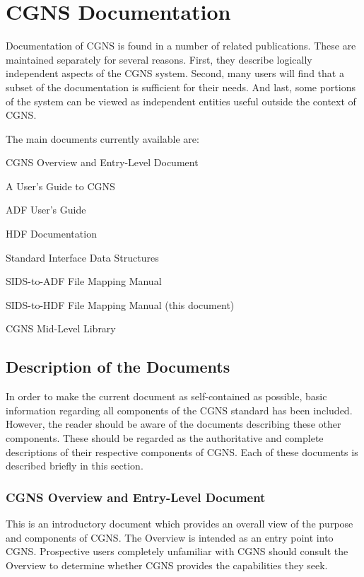 \section{CGNS Documentation}
\label{s:documentation}
\thispagestyle{plain}

Documentation of CGNS is found in a number of related
publications. These are maintained separately for several
reasons. First, they describe logically independent aspects of the CGNS
system. Second, many users will find that a subset of the documentation
is sufficient for their needs. And last, some portions of the system can
be viewed as independent entities useful outside the context of CGNS.

The main documents currently available are:

\begin{itemize*}
\item CGNS Overview and Entry-Level Document
\item A User's Guide to CGNS
\item ADF User's Guide
\item HDF Documentation
\item Standard Interface Data Structures
\item SIDS-to-ADF File Mapping Manual
\item SIDS-to-HDF File Mapping Manual (this document)
\item CGNS Mid-Level Library
\end{itemize*}

\subsection{Description of the Documents}

In order to make the current document as self-contained as possible,
basic information regarding all components of the CGNS standard has
been included. However, the reader should be aware of the documents
describing these other components. These should be regarded as the
authoritative and complete descriptions of their respective components
of CGNS. Each of these documents is described briefly in this section.

\subsubsection{CGNS Overview and Entry-Level Document}

This is an introductory document which provides an overall view of the
purpose and components of CGNS. The Overview is intended as an entry
point into CGNS. Prospective users completely unfamiliar with CGNS
should consult the Overview to determine whether CGNS provides the
capabilities they seek.

